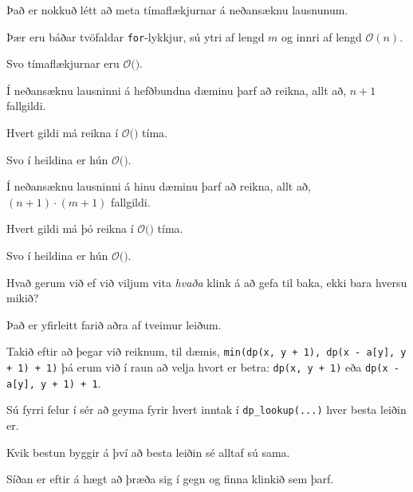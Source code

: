 {
}

{
	{
		\item<1-> Það er nokkuð létt að meta tímaflækjurnar á neðansæknu lausnunum.
		\item<2-> Þær eru báðar tvöfaldar \texttt{for}-lykkjur, sú ytri af lengd $m$ og innri af lengd $\mathcal{O}(n)$.
		\item<3-> Svo tímaflækjurnar eru $\mathcal{O}($\onslide<4->{$n \cdot m$}$)$.
	}
}

{
	{
		\item<1-> Í neðansæknu lausninni á hefðbundna dæminu þarf að reikna, allt að, $n + 1$ fallgildi.
		\item<2-> Hvert gildi má reikna í $\mathcal{O}($$)$ tíma.
		\item<4-> Svo í heildina er hún $\mathcal{O}($\onslide<5->{$n \cdot m$}$)$.
		\item<1->[] 
	}
}

{
	{
		\item<1-> Í neðansæknu lausninni á hinu dæminu þarf að reikna, allt að, $(n + 1) \cdot (m + 1)$ fallgildi.
		\item<2-> Hvert gildi má þó reikna í $\mathcal{O}($$)$ tíma.
		\item<4-> Svo í heildina er hún $\mathcal{O}($\onslide<5->{$n \cdot m$}$)$.
		\item<1->[] 
	}
}

{
	{
		\item<1-> Hvað gerum við ef við viljum vita \emph{hvaða} klink á að gefa til baka, ekki bara hversu mikið?
		\item<2-> Það er yfirleitt farið aðra af tveimur leiðum.
		\item<3-> Takið eftir að þegar við reiknum, til dæmis, \texttt{min(dp(x, y + 1), dp(x - a[y], y + 1) + 1)}
					þá erum við í raun að velja hvort er betra: \texttt{dp(x, y + 1)} eða \texttt{dp(x - a[y], y + 1) + 1}.
		\item<4-> Sú fyrri felur í sér að geyma fyrir hvert inntak í \texttt{dp\_lookup(...)} hver besta leiðin er.
		\item<5-> Kvik bestun byggir á því að besta leiðin sé alltaf sú sama.
		\item<6-> Síðan er eftir á hægt að þræða sig í gegn og finna klinkið sem þarf.
	}
}

